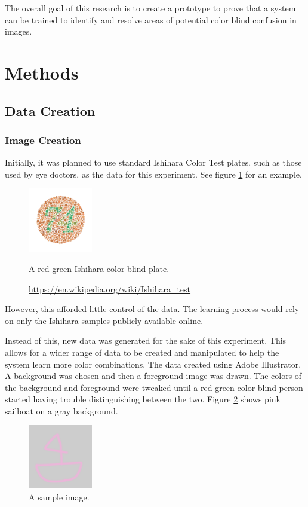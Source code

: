 \documentclass[12pt]{article}
\begin{document}
The overall goal of this research is to create a prototype to prove that a system can be trained to identify and resolve areas of potential color blind confusion in images.


\section{Methods}

\subsection{Data Creation}
\subsubsection{Image Creation}
Initially, it was planned to use standard Ishihara Color Test plates, such as those used by eye doctors, as the data for this experiment. See figure \ref{fig:ishi} for an example.

\begin{figure}[H]
	\centering
	\includegraphics[width=0.25\textwidth]{img/Ishihara}
	\caption{A red-green Ishihara color blind plate.}
	\caption*{\href{https://en.wikipedia.org/wiki/Ishihara\_test}{https://en.wikipedia.org/wiki/Ishihara\_test}}
	\label{fig:ishi}
\end{figure}

However, this afforded little control of the data. The learning process would rely on only the Ishihara samples publicly available online. 

Instead of this, new data was generated for the sake of this experiment. This allows for a wider range of data to be created and manipulated to help the system learn more color combinations. The data created using Adobe Illustrator. A background was chosen and then a foreground image was drawn. The colors of the background and foreground were tweaked until a red-green color blind person started having trouble distinguishing between the two. Figure \ref{fig:data1} shows pink sailboat on a gray background.

\begin{figure}[H]
	\centering
	\includegraphics[width=0.25\textwidth]{img/data2.png}
	\caption{A sample image.}
	\label{fig:data1}
\end{figure}
\end{document}
